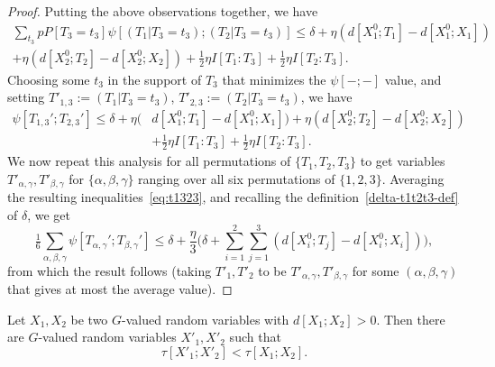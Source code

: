 \begin{proof}
  Putting the above observations together, we have
  \begin{align*}
   \sum_{t_3}p P[T_3=t_3] \psi[(T_1 | T_3=t_3); (T_2 | T_3=t_3)] \leq \delta + \eta (d[X^0_1;T_1]-d[X^0_1;X_1]) \\
     + \eta (d[X^0_2;T_2]-d[X^0_2;X_2]) + \tfrac12 \eta I[T_1:T_3] + \tfrac12 \eta I[T_2:T_3].
   \end{align*}
   Choosing some $t_3$ in the support of $T_3$ that minimizes the $\psi[-;-]$ value, and setting $T'_{1,3} := (T_1 | T_3 = t_3)$, $T'_{2,3} := (T_2 | T_3 = t_3)$, we have
  \begin{align}\nonumber
   \psi[T_{1,3}';T_{2,3}'] \leq \delta + \eta (& d[X^0_1;T_1]-d[X^0_1;X_1])
      + \eta (d[X^0_2;T_2]-d[X^0_2;X_2]) \\ & + \tfrac12 \eta I[T_1:T_3] + \tfrac12 \eta I[T_2:T_3].
     \label{eq:t1323}
  \end{align}
  We now repeat this analysis for all permutations of $\{T_1,T_2,T_3\}$ to get variables $T'_{\alpha,\gamma}, T'_{\beta,\gamma}$ for $\{\alpha,\beta,\gamma\}$ ranging over all six permutations of $\{1,2,3\}$.
  Averaging the resulting inequalities~\eqref{eq:t1323}, and recalling the definition~\eqref{delta-t1t2t3-def} of $\delta$, we get
  \[ \tfrac16 \sum_{\alpha,\beta,\gamma} \psi[T_{\alpha,\gamma}';T_{\beta,\gamma}']  \leq  \delta + \frac{\eta}{3} \biggl( \delta + \sum_{i=1}^2 \sum_{j = 1}^3 (d[X^0_i;T_j]-d[X^0_i;X_i]) \biggr),
  \]
  from which the result follows (taking $T'_1,T'_2$ to be $T'_{\alpha,\gamma},T'_{\beta,\gamma}$ for some $(\alpha,\beta,\gamma)$ that gives at most the average value).
\end{proof}




\begin{theorem}\label{de-prop}
  \leanok
  Let $X_1, X_2$ be two $G$-valued random variables with $d[X_1;X_2] > 0$. Then there are $G$-valued random variables $X'_1, X'_2$ such that
$$\tau[X'_1;X'_2] < \tau[X_1;X_2].
$$
\end{theorem}

